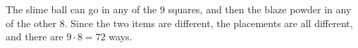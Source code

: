 The slime ball can go in any of the $9$ squares, and then the blaze powder in any of the other $8$. Since the two items are different, the placements are all different, and there are $9\cdot8=\boxed{72}$ ways.
